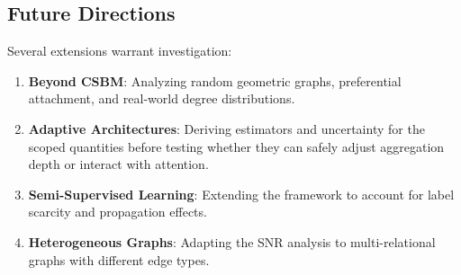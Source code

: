 \subsection{Future Directions}

Several extensions warrant investigation:

\begin{enumerate}
    \item \textbf{Beyond CSBM}: Analyzing random geometric graphs, preferential attachment, and real-world degree distributions.

    \item \textbf{Adaptive Architectures}: Deriving estimators and uncertainty for the scoped quantities before testing whether they can safely adjust aggregation depth or interact with attention.

    \item \textbf{Semi-Supervised Learning}: Extending the framework to account for label scarcity and propagation effects.

    \item \textbf{Heterogeneous Graphs}: Adapting the SNR analysis to multi-relational graphs with different edge types.
\end{enumerate}
